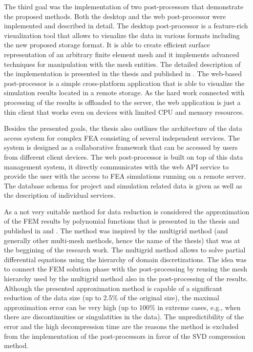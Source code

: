 The third goal was the implementation of two post-processors that demonstrate the proposed methods. Both the desktop and the web post-processor were implemented and described in detail. The desktop post-processor is a feature-rich visualization tool that allows to visualize the data in various formats including the new proposed storage format. It is able to create efficient surface representation of an arbitrary finite element mesh and it implements advanced techniques for manipulation with the mesh entities. The detailed description of the implementation is presented in the thesis and published in \cite{Benes2015}. The web-based post-processor is a simple cross-platform application that is able to visualize the simulation results located in a remote storage. As the hard work connected with processing of the results is offloaded to the server, the web application is just a thin client that works even on devices with limited CPU and memory resources.

Besides the presented goals, the thesis also outlines the architecture of the data access system for complex FEA consisting of several independent services. The system is designed as a collaborative framework that can be accessed by users from different client devices. The web post-processor is built on top of this data management system, it directly communicates with the web API service to provide the user with the access to FEA simulations running on a remote server. The database schema for project and simulation related data is given as well as the description of individual services.

As a not very suitable method for data reduction is considered the approximation of the FEM results by polynomial functions that is presented in the thesis and published in \cite{Benes2016} and \cite{Benes2016Pollack}. The method was inspired by the multigrid method (and generally other multi-mesh methods, hence the name of the thesis) that was at the beggining of the research work. The multigrid method allows to solve partial differential equations using the hierarchy of domain discretizations. The idea was to connect the FEM solution phase with the post-processing by reusing the mesh hierarchy used by the multigrid method also in the post-processing of the results. Although the presented approximation method is capable of a significant reduction of the data size (up to 2.5\% of the original size), the maximal approximation error can be very high (up to 100\% in extreme cases, e.g., when there are discontinuities or singulatities in the data). The unpredictibility of the error and the high decompression time are the reasons the method is excluded from the implementation of the post-processors in favor of the SVD compression method.

